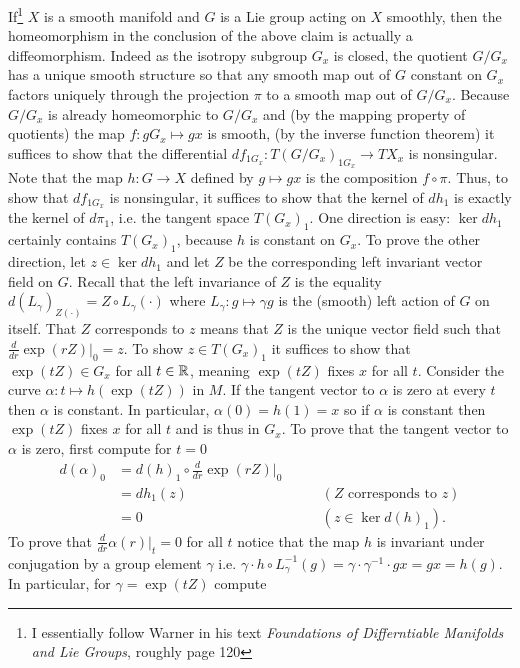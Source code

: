 \documentclass[11pt]{amsart}
\begin{document}
\begin{remark}
If\footnote{I essentially follow Warner in his text \emph{Foundations of Differntiable Manifolds and Lie Groups}, roughly page 120} $X$ is a smooth manifold and $G$ is a Lie group acting on $X$ smoothly, then the homeomorphism in the conclusion of the above claim is actually a diffeomorphism. Indeed as the isotropy subgroup $G_x$ is closed, the quotient $G/G_x$ has a unique smooth structure so that any smooth map out of $G$ constant on $G_x$ factors uniquely through the projection $\pi$ to a smooth map out of $G/G_x$. Because $G/G_x$ is already homeomorphic to $G/G_x$ and (by the mapping property of quotients) the map $f:gG_x\mapsto gx$ is smooth, (by the inverse function theorem) it suffices to show that the differential  $df_{1G_x}:T(G/G_x)_{1G_x}\to TX_x$ is nonsingular. Note that the map $h:G\to X$ defined by $g\mapsto gx$ is the composition $f\circ \pi$. Thus, to show that $df_{1G_x}$ is nonsingular, it suffices to show that the kernel of $dh_1$ is exactly the kernel of $d\pi_1$, i.e. the tangent space $T(G_x)_{1}$. One direction is easy: $\ker dh_1$ certainly contains $T(G_x)_1$, because $h$ is constant on $G_x$. To prove the other direction, let $z \in \ker dh_1$ and let $Z$ be the corresponding left invariant vector field on $G$. Recall that the left invariance of $Z$ is the equality $d(L_\gamma)_{Z(\cdot)}= Z\circ L_\gamma(\cdot)$ where $L_\gamma :g\mapsto \gamma g$ is the (smooth) left action of $G$ on itself. That $Z$ corresponds to $z$ means that $Z$ is the unique vector field such that $\frac{d}{dr}\exp(rZ)|_0=z$. To show $z\in T(G_x)_1$ it suffices to show that $\exp(tZ) \in G_x$ for all $t\in \mathbb{R}$, meaning $\exp(tZ)$ fixes $x$ for all $t$. Consider the curve $\alpha: t\mapsto h(\exp(tZ))$ in $M$. If the tangent vector to $\alpha$ is zero at every $t$ then $\alpha$ is constant. In particular, $\alpha(0)=h(1)=x$ so if $\alpha$ is constant then $\exp(tZ)$ fixes $x$ for all $t$ and is thus in $G_x$. To prove that the tangent vector to $\alpha$ is zero, first compute for $t=0$
	\begin{align*}
		d(\alpha)_0&=d(h)_{1}\circ \frac{d}{dr}\exp(r Z)|_0\\
				 &=dh_1(z) &\qquad \left(Z \text{ corresponds to } z\right)\\
				 &=0		    &\qquad \left(z\in \ker{d(h)_1} \right).
	\end{align*}
To prove that $\frac{d}{dr}\alpha(r)|_t=0$ for all $t$ notice that the map $h$ is invariant under conjugation by a group element $\gamma$ i.e. $\gamma \cdot h \circ L_\gamma^{-1} (g)=\gamma \cdot \gamma^{-1} \cdot g x=gx=h(g)$. In particular, for $\gamma=\exp(tZ)$ compute

\end{remark}
\end{document}
